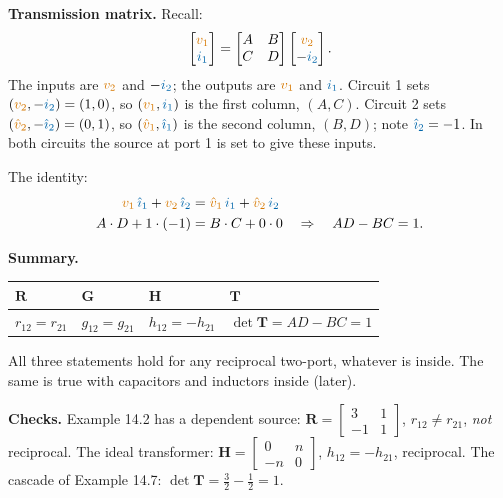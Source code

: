 \documentclass[11pt,a4paper]{article}
\newcommand{\Icol}[1]{\textcolor{ccur}{#1}}
\newcommand{\Vcol}[1]{\textcolor{cvolt}{#1}}
\newcommand{\uni}[1]{\,\mathrm{#1}}
\newcommand{\A}{\uni{A}}   \newcommand{\V}{\uni{V}}
\newcommand{\yes}{\textcolor{cpow}{\checkmark}}
\newcommand{\vone}{\Vcol{v_1}}  \newcommand{\vtwo}{\Vcol{v_2}}
\newcommand{\ione}{\Icol{i_1}}  \newcommand{\itwo}{\Icol{i_2}}
\newcommand{\Rm}{\mathbf{R}}  \newcommand{\Gm}{\mathbf{G}}
\newcommand{\Hm}{\mathbf{H}}  \newcommand{\Tm}{\mathbf{T}}
\newcommand{\rcp}[4]{%
  \draw[elem] (1.6,-0.2) rectangle (3.8,2.2);
  \node[align=center, font=\small] at (2.7,1.0) {LTI\\ resistors};
  \draw (1.1,1.8) -- (1.6,1.8); \draw (1.1,0) -- (1.6,0);
  \draw (3.8,1.8) -- (4.3,1.8); \draw (3.8,0) -- (4.3,0);
  \ifcase#1
    \draw (0,1.8) to[american voltage source, l_=#2] (0,0); \draw (0,1.8) -- (1.1,1.8); \draw (0,0) -- (1.1,0);
  \or
    \draw (0,0) to[american current source, l=#2] (0,1.8); \draw (0,1.8) -- (1.1,1.8); \draw (0,0) -- (1.1,0);
  \or
    \draw (0,1.8) -- (0,0); \draw (0,1.8) -- (1.1,1.8); \draw (0,0) -- (1.1,0);
    \draw[iar] (0.25,2.08) -- (0.85,2.08); \node[font=\small, anchor=south] at (0.55,2.12) {#2};
  \or
    \node[pol] at (1.05,1.45) {$+$}; \node[pol] at (1.05,0.35) {$-$};
    \node[font=\small, anchor=east] at (1.0,0.9) {#2};
  \or
    \draw (0,1.8) -- (0,1.22); \draw (0,0.58) -- (0,0);
    \node[circle, draw, thick, minimum size=0.64cm, inner sep=0pt, font=\small\bfseries] at (0,0.9) {A};
    \node[font=\small, anchor=east] at (-0.38,0.9) {#2};
    \draw (0,1.8) -- (1.1,1.8); \draw (0,0) -- (1.1,0);
  \fi
  \ifcase#3
    \draw (5.4,1.8) to[american voltage source, l=#4] (5.4,0); \draw (4.3,1.8) -- (5.4,1.8); \draw (4.3,0) -- (5.4,0);
  \or
    \draw (5.4,0) to[american current source, l_=#4] (5.4,1.8); \draw (4.3,1.8) -- (5.4,1.8); \draw (4.3,0) -- (5.4,0);
  \or
    \draw (5.4,1.8) -- (5.4,0); \draw (4.3,1.8) -- (5.4,1.8); \draw (4.3,0) -- (5.4,0);
    \draw[iar] (5.15,2.08) -- (4.55,2.08); \node[font=\small, anchor=south] at (4.85,2.12) {#4};
  \or
    \node[pol] at (4.35,1.45) {$+$}; \node[pol] at (4.35,0.35) {$-$};
    \node[font=\small, anchor=west] at (4.4,0.9) {#4};
  \or
    \draw (5.4,1.8) -- (5.4,1.22); \draw (5.4,0.58) -- (5.4,0);
    \node[circle, draw, thick, minimum size=0.64cm, inner sep=0pt, font=\small\bfseries] at (5.4,0.9) {A};
    \node[font=\small, anchor=west] at (5.78,0.9) {#4};
    \draw (4.3,1.8) -- (5.4,1.8); \draw (4.3,0) -- (5.4,0);
  \fi
  \draw (1.1,1.8) node[ocirc] {}; \draw (1.1,0) node[ocirc] {};
  \draw (4.3,1.8) node[ocirc] {}; \draw (4.3,0) node[ocirc] {};}
\newcommand{\lcur}[1]{\draw[iar] (0.25,2.08) -- (0.85,2.08); \node[font=\small, anchor=south] at (0.55,2.12) {#1};}
\newcommand{\rcur}[1]{\draw[iar] (5.15,2.08) -- (4.55,2.08); \node[font=\small, anchor=south] at (4.85,2.12) {#1};}
\newcommand{\mtest}[2]{%
  \ifnum#2=1
    \if#1R \rcp{1}{$\Icol{1\A}$}{3}{$\Vcol{r_{21}}$}\fi
    \if#1G \rcp{0}{$\Vcol{1\V}$}{2}{$\Icol{g_{21}}$}\lcur{$\Icol{g_{11}}$}\fi
    \if#1H \rcp{1}{$\Icol{1\A}$}{2}{$\Icol{h_{21}}$}\fi
    \if#1T \rcp{0}{$\Vcol{A}$}{3}{$\Vcol{1\V}$}\lcur{$\Icol{C}$}\fi
  \else
    \if#1R \rcp{3}{$\Vcol{r_{12}}$}{1}{$\Icol{1\A}$}\fi
    \if#1G \rcp{2}{$\Icol{g_{12}}$}{0}{$\Vcol{1\V}$}\rcur{$\Icol{g_{22}}$}\fi
    \if#1H \rcp{3}{$\Vcol{h_{12}}$}{0}{$\Vcol{1\V}$}\rcur{$\Icol{h_{22}}$}\fi
    \if#1T \rcp{0}{$\Vcol{B}$}{2}{$\Icol{-1\A}$}\lcur{$\Icol{D}$}\fi
  \fi}
\newcommand{\mpair}[1]{%
  \mtest{#1}{1}
  \begin{scope}[xshift=7.8cm] \mtest{#1}{2} \end{scope}
  \node[font=\small, text=metugray] at (2.7,-0.75) {circuit 1};
  \node[font=\small, text=metugray] at (10.5,-0.75) {circuit 2};}
\begin{document}
\noindent\textbf{Transmission matrix.} Recall:
\[
  \begin{bmatrix} \vone\\ \ione \end{bmatrix} = \begin{bmatrix} A & B\\ C & D \end{bmatrix} \begin{bmatrix} \vtwo\\ -\itwo \end{bmatrix} .
\]
The inputs are $\vtwo$ and $-\itwo$; the outputs are $\vone$ and $\ione$. Circuit 1 sets $(\vtwo, -\itwo) = (1, 0)$, so $(\vone, \ione)$ is the first column, $(A, C)$. Circuit 2 sets $(\Vcol{\hat v_2}, -\Icol{\hat\imath_2}) = (0, 1)$, so $(\Vcol{\hat v_1}, \Icol{\hat\imath_1})$ is the second column, $(B, D)$; note $\Icol{\hat\imath_2} = -1$. In both circuits the source at port 1 is set to give these inputs.
\begin{center}
\end{center}
The identity:
\begin{align*}
  \vone\,\Icol{\hat\imath_1} + \vtwo\,\Icol{\hat\imath_2} &= \Vcol{\hat v_1}\,\ione + \Vcol{\hat v_2}\,\itwo\\
  A \cdot D + 1 \cdot (-1) &= B \cdot C + 0 \cdot 0 \quad\Rightarrow\quad AD - BC = 1 .
\end{align*}

\textbf{Summary.}
\begin{center}
\small
\renewcommand{\arraystretch}{1.4}
\begin{tabular}{@{}llll@{}}
\toprule
$\Rm$ & $\Gm$ & $\Hm$ & $\Tm$\\
\midrule
$r_{12} = r_{21}$ & $g_{12} = g_{21}$ & $h_{12} = -h_{21}$ & $\det\Tm = AD - BC = 1$\\
\bottomrule
\end{tabular}
\end{center}
All three statements hold for any reciprocal two-port, whatever is inside. The same is true
with capacitors and inductors inside (later).

\textbf{Checks.} Example 14.2 has a dependent source: $\Rm = \left[\begin{smallmatrix} 3 & 1\\ -1 & 1 \end{smallmatrix}\right]$,
$r_{12} \neq r_{21}$, \emph{not} reciprocal. The ideal transformer:
$\Hm = \left[\begin{smallmatrix} 0 & n\\ -n & 0 \end{smallmatrix}\right]$, $h_{12} = -h_{21}$,
reciprocal. The cascade of Example 14.7: $\det\Tm = \frac32 - \frac12 = 1$. \ \yes
\end{document}
